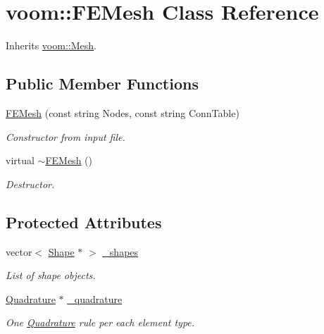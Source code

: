 \hypertarget{classvoom_1_1_f_e_mesh}{
\section{voom::FEMesh Class Reference}
\label{classvoom_1_1_f_e_mesh}
}


Inherits \hyperlink{classvoom_1_1_mesh}{voom::Mesh}.\subsection*{Public Member Functions}
\begin{DoxyCompactItemize}
\item 
\hypertarget{classvoom_1_1_f_e_mesh_a46d005aa22a07580ad56eb04dbb6d5a1}{
\hyperlink{classvoom_1_1_f_e_mesh_a46d005aa22a07580ad56eb04dbb6d5a1}{FEMesh} (const string Nodes, const string ConnTable)}
\label{classvoom_1_1_f_e_mesh_a46d005aa22a07580ad56eb04dbb6d5a1}

\begin{DoxyCompactList}\small\item\em Constructor from input file. \item\end{DoxyCompactList}\item 
virtual \hyperlink{classvoom_1_1_f_e_mesh_aca0b20d3ed91ee94eb8cd479de75ca05}{$\sim$FEMesh} ()
\begin{DoxyCompactList}\small\item\em Destructor. \item\end{DoxyCompactList}\end{DoxyCompactItemize}
\subsection*{Protected Attributes}
\begin{DoxyCompactItemize}
\item 
\hypertarget{classvoom_1_1_f_e_mesh_a753be6e421389413522e312fb54e4b21}{
vector$<$ \hyperlink{classvoom_1_1_shape}{Shape} $\ast$ $>$ \hyperlink{classvoom_1_1_f_e_mesh_a753be6e421389413522e312fb54e4b21}{\_\-shapes}}
\label{classvoom_1_1_f_e_mesh_a753be6e421389413522e312fb54e4b21}

\begin{DoxyCompactList}\small\item\em List of shape objects. \item\end{DoxyCompactList}\item 
\hypertarget{classvoom_1_1_f_e_mesh_a3d20d49720e1e043d341e8c2cc53dacc}{
\hyperlink{classvoom_1_1_quadrature}{Quadrature} $\ast$ \hyperlink{classvoom_1_1_f_e_mesh_a3d20d49720e1e043d341e8c2cc53dacc}{\_\-quadrature}}
\label{classvoom_1_1_f_e_mesh_a3d20d49720e1e043d341e8c2cc53dacc}

\begin{DoxyCompactList}\small\item\em One \hyperlink{classvoom_1_1_quadrature}{Quadrature} rule per each element type. \item\end{DoxyCompactList}\end{DoxyCompactItemize}


